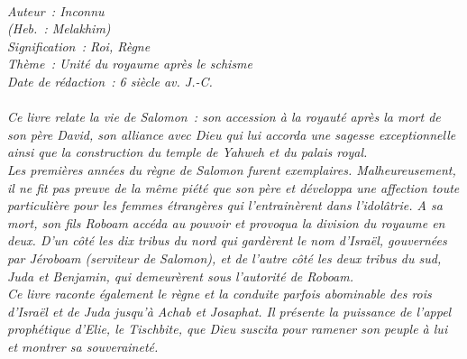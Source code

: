 \BFont
\noindent\hrulefill
{\footnotesize
\textit{
\bigskip
{\centering{}
\\Auteur~: Inconnu
\\(Heb.~: Melakhim)
\\Signification~: Roi, Règne
\\Thème~: Unité du royaume après le schisme
\\Date de rédaction~: 6 siècle av. J.-C.\\}
}
\textit{
\\Ce livre relate la vie de Salomon~: son accession à la royauté après la mort de son père David, son alliance avec Dieu qui lui accorda une sagesse exceptionnelle ainsi que la construction du temple de Yahweh et du palais royal.
\\Les premières années du règne de Salomon furent exemplaires. Malheureusement, il ne fit pas preuve de la même piété que son père et développa une affection toute particulière pour les femmes étrangères qui l'entrainèrent dans l'idolâtrie. A sa mort, son fils Roboam accéda au pouvoir et provoqua la division du royaume en deux. D'un côté les dix tribus du nord qui gardèrent le nom d'Israël, gouvernées par Jéroboam (serviteur de Salomon), et de l'autre côté les deux tribus du sud, Juda et Benjamin, qui demeurèrent sous l'autorité de Roboam.
\\Ce livre raconte également le règne et la conduite parfois abominable des rois d'Israël et de Juda jusqu'à Achab et Josaphat. Il présente la puissance de l'appel prophétique d'Elie, le Tischbite, que Dieu suscita pour ramener son peuple à lui et montrer sa souveraineté.\bigskip
}
}
\par\nobreak\noindent\hrulefill
